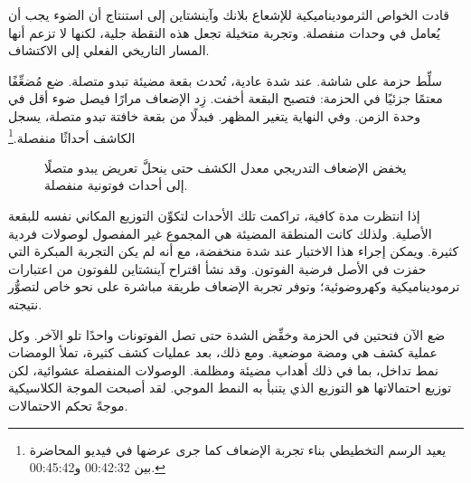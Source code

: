 قادت الخواص الثرموديناميكية للإشعاع بلانك وآينشتاين إلى استنتاج أن الضوء يجب أن يُعامل في وحدات منفصلة. وتجربة متخيلة تجعل هذه النقطة جلية، لكنها لا تزعم أنها المسار التاريخي الفعلي إلى الاكتشاف.

سلِّط حزمة على شاشة. عند شدة عادية، تُحدث بقعة مضيئة تبدو متصلة. ضع مُضعِّفًا معتمًا جزئيًا في الحزمة: فتصبح البقعة أخفت. زِد الإضعاف مرارًا فيصل ضوء أقل في وحدة الزمن. وفي النهاية يتغير المظهر. فبدلًا من بقعة خافتة تبدو متصلة، يسجل الكاشف أحداثًا منفصلة.\footnote{يعيد الرسم التخطيطي بناء تجربة الإضعاف كما جرى عرضها في فيديو المحاضرة بين 00:42:32 و00:45:42.}

\begin{figure}[h]
\centering
{}
\caption{يخفض الإضعاف التدريجي معدل الكشف حتى ينحلَّ تعريض يبدو متصلًا إلى أحداث فوتونية منفصلة.}
\end{figure}

إذا انتظرت مدة كافية، تراكمت تلك الأحداث لتكوِّن التوزيع المكاني نفسه للبقعة الأصلية. ولذلك كانت المنطقة المضيئة هي المجموع غير المفصول لوصولات فردية كثيرة. ويمكن إجراء هذا الاختبار عند شدة منخفضة، مع أنه لم يكن التجربة المبكرة التي حفزت في الأصل فرضية الفوتون. وقد نشأ اقتراح آينشتاين للفوتون من اعتبارات ترموديناميكية وكهروضوئية؛ وتوفر تجربة الإضعاف طريقة مباشرة على نحو خاص لتصوُّر نتيجته.

ضع الآن فتحتين في الحزمة وخفِّض الشدة حتى تصل الفوتونات واحدًا تلو الآخر. وكل عملية كشف هي ومضة موضعية. ومع ذلك، بعد عمليات كشف كثيرة، تملأ الومضات نمط تداخل، بما في ذلك أهداب مضيئة ومظلمة. الوصولات المنفصلة عشوائية، لكن توزيع احتمالاتها هو التوزيع الذي يتنبأ به النمط الموجي. لقد أصبحت الموجة الكلاسيكية موجةً تحكم الاحتمالات.

